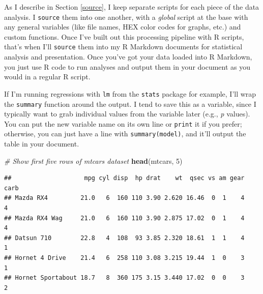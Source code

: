 \documentclass[
  openany]{book}
\newenvironment{Shaded}{\begin{snugshade}}{\end{snugshade}}
\newcommand{\CommentTok}[1]{\textcolor[rgb]{0.56,0.35,0.01}{\textit{#1}}}
\newcommand{\DecValTok}[1]{\textcolor[rgb]{0.00,0.00,0.81}{#1}}
\newcommand{\KeywordTok}[1]{\textcolor[rgb]{0.13,0.29,0.53}{\textbf{#1}}}
\newcommand{\NormalTok}[1]{#1}
\newcommand{\OperatorTok}[1]{\textcolor[rgb]{0.81,0.36,0.00}{\textbf{#1}}}
\newcommand{\StringTok}[1]{\textcolor[rgb]{0.31,0.60,0.02}{#1}}
\begin{document}
As I describe in Section \ref{source}, I keep separate scripts for each piece of the data analysis. I \texttt{source} them into one another, with a \emph{global} script at the base with any general variables (like file names, HEX color codes for graphs, etc.) and custom functions. Once I've built out this processing pipeline with R scripts, that's when I'll \texttt{source} them into my R Markdown documents for statistical analysis and presentation. Once you've got your data loaded into R Markdown, you just use R code to run analyses and output them in your document as you would in a regular R script.

If I'm running regressions with \texttt{lm} from the \texttt{stats} package for example, I'll wrap the \texttt{summary} function around the output. I tend to save this as a variable, since I typically want to grab individual values from the variable later (e.g., \emph{p} values). You can put the new variable name on its own line or \texttt{print} it if you prefer; otherwise, you can just have a line with \texttt{summary(model)}, and it'll output the table in your document.

\begin{Shaded}
\begin{Highlighting}[]
\CommentTok{# Show first five rows of mtcars dataset}
\KeywordTok{head}\NormalTok{(mtcars, }\DecValTok{5}\NormalTok{)}
\end{Highlighting}
\end{Shaded}

\begin{verbatim}
##                    mpg cyl disp  hp drat    wt  qsec vs am gear carb
## Mazda RX4         21.0   6  160 110 3.90 2.620 16.46  0  1    4    4
## Mazda RX4 Wag     21.0   6  160 110 3.90 2.875 17.02  0  1    4    4
## Datsun 710        22.8   4  108  93 3.85 2.320 18.61  1  1    4    1
## Hornet 4 Drive    21.4   6  258 110 3.08 3.215 19.44  1  0    3    1
## Hornet Sportabout 18.7   8  360 175 3.15 3.440 17.02  0  0    3    2
\end{verbatim}

\begin{Shaded}
\end{Shaded}
\end{document}
